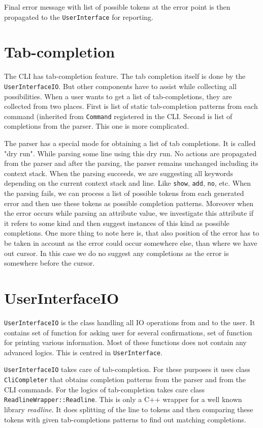 \documentclass[deska]{subfiles}
\begin{document}
Final error message with list of possible tokens at the error point is then propagated to the {\tt UserInterface} for reporting.

\section{Tab-completion}

The CLI has tab-completion feature. The tab completion itself is done by the {\tt UserInterfaceIO}. But other components
have to assist while collecting all possibilities. When a user wants to get a list of tab-completions, they are collected
from two places. First is list of static tab-completion patterns from each command (inherited from {\tt Command} registered
in the CLI. Second is list of completions from the parser. This one is more complicated.

The parser has a special mode for obtaining a list of tab completions. It is called "dry run". While parsing some line using
this dry run. No actions are propagated from the parser and after the parsing, the parser remains unchanged including its
context stack. When the parsing succeeds, we are suggesting all keywords depending on the current context stack and line.
Like {\tt show}, {\tt add}, {\tt no}, etc. When the parsing fails, we can process a list of possible tokens from each generated error
and then use these tokens as possible completion patterns. Moreover when the error occurs while parsing an attribute
value, we investigate this attribute if it refers to some kind and then suggest instances of this kind as possible completions.
One more thing to note here is, that also position of the error has to be taken in account as the error could occur somewhere
else, than where we have out cursor. In this case we do no suggest any completions as the error is somewhere before the
cursor.

\section{UserInterfaceIO}

{\tt UserInterfaceIO} is the class handling all IO operations from and to the user. It contains set of function for asking
user for several confirmations, set of function for printing various information. Most of these functions does not
contain any advanced logics. This is centred in {\tt UserInterface}.

{\tt UserInterfaceIO} takes care of tab-completion. For these purposes it uses class {\tt CliCompleter} that obtains completion
patterns from the parser and from the CLI commands. For the logics of tab-completion takes care class {\tt ReadlineWrapper::Readline}.
This is only a C++ wrapper for a well known library {\em readline}. It does splitting of the line to tokens and then comparing
these tokens with given tab-completions patterns to find out matching completions.
\end{document}

